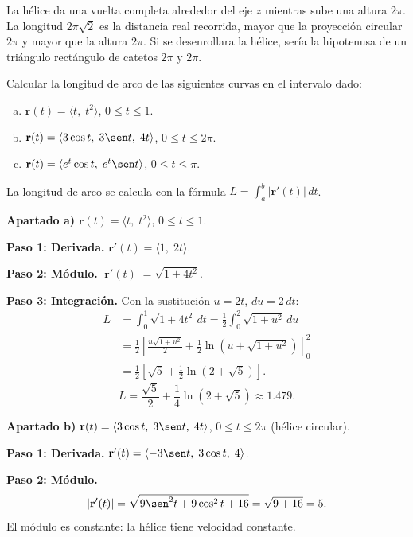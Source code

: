 \begin{rem}
La hélice da una vuelta completa alrededor del eje $z$ mientras sube
una altura $2\pi$. La longitud $2\pi\sqrt{2}$ es la distancia real
recorrida, mayor que la proyección circular $2\pi$ y mayor que la
altura $2\pi$. Si se desenrollara la hélice, sería la hipotenusa de un
triángulo rectángulo de catetos $2\pi$ y $2\pi$.
\end{rem}

\begin{prob}
Calcular la longitud de arco de las siguientes curvas en el intervalo
dado:
\begin{enumerate}[a)]
  \item $\mathbf{r}(t) = \langle t,\; t^2 \rangle$,
        $0 \leq t \leq 1$.
  \item $\mathbf{r}(t) = \langle 3\cos t,\; 3\sen t,\; 4t \rangle$,
        $0 \leq t \leq 2\pi$.
  \item $\mathbf{r}(t) = \langle e^t \cos t,\; e^t \sen t \rangle$,
        $0 \leq t \leq \pi$.
\end{enumerate}
\begin{myproof}
La longitud de arco se calcula con la fórmula $L=\displaystyle\int_a^b|\mathbf{r}'(t)|\,dt$.

\textbf{Apartado a)} $\mathbf{r}(t)=\langle t,\;t^2\rangle$, $0\le t\le 1$.

\textbf{Paso 1: Derivada.} $\mathbf{r}'(t)=\langle 1,\;2t\rangle$.

\textbf{Paso 2: Módulo.} $|\mathbf{r}'(t)|=\sqrt{1+4t^2}$.

\textbf{Paso 3: Integración.} Con la sustitución $u=2t$, $du=2\,dt$:
\begin{align*}
L &= \int_0^1\sqrt{1+4t^2}\,dt
   = \frac{1}{2}\int_0^2\sqrt{1+u^2}\,du \\
  &= \frac{1}{2}\left[\frac{u\sqrt{1+u^2}}{2}+\frac{1}{2}\ln\!\left(u+\sqrt{1+u^2}\right)\right]_0^2 \\
  &= \frac{1}{2}\!\left[\sqrt{5}+\frac{1}{2}\ln(2+\sqrt{5})\right].
\end{align*}
\[
  \boxed{L = \frac{\sqrt{5}}{2}+\frac{1}{4}\ln\!\left(2+\sqrt{5}\right)\approx 1.479.}
\]

\textbf{Apartado b)} $\mathbf{r}(t)=\langle 3\cos t,\;3\sen t,\;4t\rangle$, $0\le t\le 2\pi$ (hélice circular).

\textbf{Paso 1: Derivada.} $\mathbf{r}'(t)=\langle -3\sen t,\;3\cos t,\;4\rangle$.

\textbf{Paso 2: Módulo.}
\[
  |\mathbf{r}'(t)|=\sqrt{9\sen^2 t+9\cos^2 t+16}=\sqrt{9+16}=5.
\]
El módulo es constante: la hélice tiene velocidad constante.


\end{myproof}
\end{prob}
